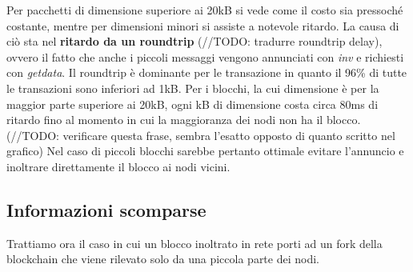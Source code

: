 Per pacchetti di dimensione superiore ai 20kB si vede come il costo sia
pressoché costante, mentre per dimensioni minori si assiste a notevole
ritardo. La causa di ciò sta nel \textbf{ritardo da un roundtrip}
(//TODO: tradurre roundtrip delay), ovvero il fatto che anche i piccoli
messaggi vengono annunciati con \emph{inv} e richiesti con
\emph{getdata}. Il roundtrip è dominante per le transazione in quanto il
96\% di tutte le transazioni sono inferiori ad 1kB. Per i blocchi, la
cui dimensione è per la maggior parte superiore ai 20kB, ogni kB di
dimensione costa circa 80ms di ritardo fino al momento in cui la
maggioranza dei nodi non ha il blocco. (//TODO: verificare questa frase,
sembra l'esatto opposto di quanto scritto nel grafico) Nel caso di
piccoli blocchi sarebbe pertanto ottimale evitare l'annuncio e inoltrare
direttamente il blocco ai nodi vicini.

\subsection{Informazioni scomparse}\label{informazioni-scomparse}

Trattiamo ora il caso in cui un blocco inoltrato in rete porti ad un
fork della blockchain che viene rilevato solo da una piccola parte dei
nodi.

